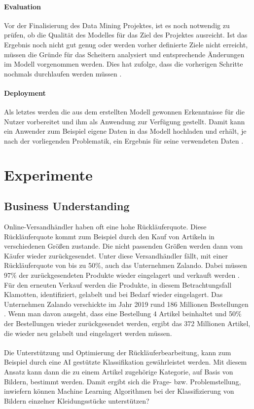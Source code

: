 \documentclass[12pt]{scrreprt}
\begin{document}
\subsubsection{Evaluation}
	
Vor der Finalisierung des Data Mining Projektes, ist es noch notwendig zu prüfen, ob die Qualität des Modelles für das Ziel des Projektes ausreicht. Ist das Ergebnis noch nicht gut genug oder werden vorher definierte Ziele nicht erreicht, müssen die Gründe für das Scheitern analysiert und entsprechende Änderungen im Modell vorgenommen werden. Dies hat zufolge, dass die vorherigen Schritte nochmals durchlaufen werden müssen \cite{Wuttke}.
	
\subsubsection{Deployment}
	
Als letztes werden die aus dem erstellten Modell gewonnen Erkenntnisse für die Nutzer vorbereitet und ihm als Anwendung zur Verfügung gestellt. Damit kann ein Anwender zum Beispiel eigene Daten in das Modell hochladen und erhält, je nach der vorliegenden Problematik, ein Ergebnis für seine verwendeten Daten \cite{Wuttke}.
	
\newpage
\chapter{Experimente}
	
\section{Business Understanding}
	
Online-Versandhändler haben oft eine hohe Rückläuferquote. Diese Rückläuferquote kommt zum Beispiel durch den Kauf von Artikeln in verschiedenen Größen zustande. Die nicht passenden Größen werden dann vom Käufer wieder zurückgesendet. Unter diese Versandhändler fällt, mit einer Rückläuferquote von bis zu 50\%, auch das Unternehmen Zalando. Dabei müssen 97\% der zurückgesendeten Produkte wieder eingelagert und verkauft werden \cite{Hoefer2018}. Für den erneuten Verkauf werden die Produkte, in diesem Betrachtungsfall Klamotten, identifiziert, gelabelt und bei Bedarf wieder eingelagert. Das Unternehmen Zalando verschickte im Jahr 2019 rund 186 Millionen Bestellungen \cite{Rabe2021}. Wenn man davon ausgeht, dass eine Bestellung 4 Artikel beinhaltet und 50\% der Bestellungen wieder zurückgesendet werden, ergibt das 372 Millionen Artikel, die wieder neu gelabelt und eingelagert werden müssen.\\
\\
Die Unterstützung und Optimierung der Rückläuferbearbeitung, kann zum Beispiel durch eine AI gestützte Klassifikation gewährleistet werden. Mit diesem Ansatz kann dann die zu einem Artikel zugehörige Kategorie, auf Basis von Bildern, bestimmt werden. Damit ergibt sich die Frage- bzw. Problemstellung, inwiefern können Machine Learning Algorithmen bei der Klassifizierung von Bildern einzelner Kleidungsstücke unterstützen?
	
\end{document}
